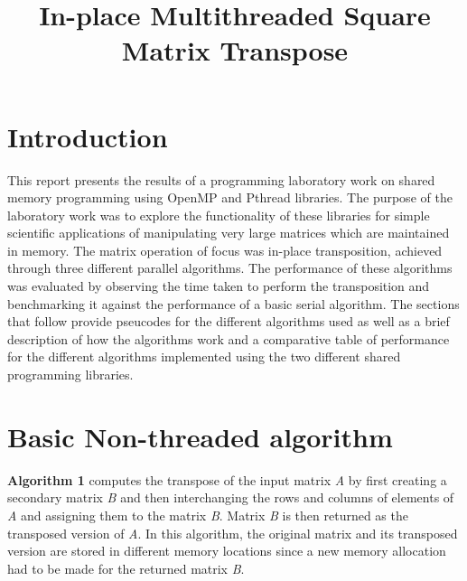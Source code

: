 \documentclass[11pt]{IEEEtran}
\begin{document}
	\title{In-place Multithreaded Square Matrix Transpose}
	\author{}
	\maketitle
	

\section{Introduction}

\noindent
This report presents the results of a programming laboratory work on shared memory programming using OpenMP and Pthread libraries. The purpose of the laboratory work was to explore the functionality of these libraries for simple scientific applications of manipulating very large matrices which are maintained in memory. The matrix operation of focus was in-place transposition, achieved through three different parallel algorithms. The performance of these algorithms was evaluated by observing the time taken to perform the transposition and benchmarking it against the performance of a basic serial algorithm. The sections that follow provide pseucodes for the different algorithms used as well as a brief description of how the algorithms work and a comparative table of performance for the different algorithms implemented using the two different shared programming libraries.


\section{Basic Non-threaded algorithm}

\noindent
\textbf{Algorithm 1} computes the transpose of the input matrix \emph{A} by first creating a secondary matrix \emph{B} and then interchanging the rows and columns of elements of \emph{A} and assigning them to the matrix \emph{B}. Matrix \emph{B} is then returned as the transposed version of \emph{A}. In this algorithm, the original matrix and its transposed version are stored in different memory locations since a new memory allocation had to be made for the returned matrix \emph{B}. \\
\end{document}
